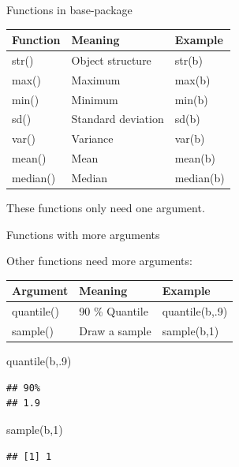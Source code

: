 \documentclass[
  10pt,
  ignorenonframetext,
]{beamer}
\newenvironment{Shaded}{\begin{snugshade}}{\end{snugshade}}
\newcommand{\DecValTok}[1]{\textcolor[rgb]{0.86,0.86,0.80}{#1}}
\newcommand{\KeywordTok}[1]{\textcolor[rgb]{0.94,0.87,0.69}{#1}}
\newcommand{\NormalTok}[1]{\textcolor[rgb]{0.80,0.80,0.80}{#1}}
\begin{document}
\begin{frame}{Functions in base-package}
\protect\hypertarget{functions-in-base-package}{}

\begin{longtable}[]{@{}lll@{}}
\toprule
Function & Meaning & Example\tabularnewline
\midrule
\endhead
str() & Object structure & str(b)\tabularnewline
max() & Maximum & max(b)\tabularnewline
min() & Minimum & min(b)\tabularnewline
sd() & Standard deviation & sd(b)\tabularnewline
var() & Variance & var(b)\tabularnewline
mean() & Mean & mean(b)\tabularnewline
median() & Median & median(b)\tabularnewline
\bottomrule
\end{longtable}

These functions only need one argument.

\end{frame}

\begin{frame}[fragile]{Functions with more arguments}
\protect\hypertarget{functions-with-more-arguments}{}

\begin{block}{Other functions need more arguments:}

\begin{longtable}[]{@{}lll@{}}
\toprule
Argument & Meaning & Example\tabularnewline
\midrule
\endhead
quantile() & 90 \% Quantile & quantile(b,.9)\tabularnewline
sample() & Draw a sample & sample(b,1)\tabularnewline
\bottomrule
\end{longtable}

\begin{Shaded}
\begin{Highlighting}[]
\KeywordTok{quantile}\NormalTok{(b,.}\DecValTok{9}\NormalTok{)}
\end{Highlighting}
\end{Shaded}

\begin{verbatim}
## 90% 
## 1.9
\end{verbatim}

\begin{Shaded}
\begin{Highlighting}[]
\KeywordTok{sample}\NormalTok{(b,}\DecValTok{1}\NormalTok{) }
\end{Highlighting}
\end{Shaded}

\begin{verbatim}
## [1] 1
\end{verbatim}

\end{block}

\end{frame}
\end{document}
